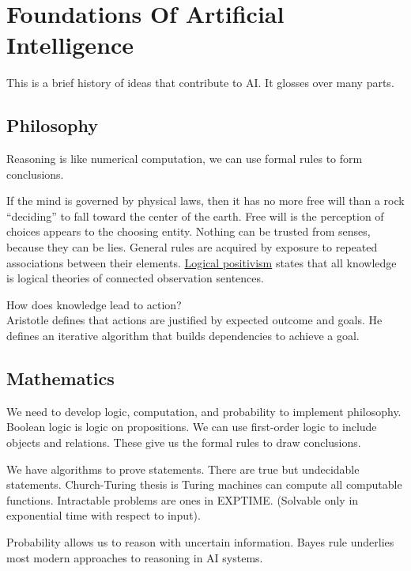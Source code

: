 
\section{Foundations Of Artificial Intelligence} %
\label{sec:foundations_of_artificial_intelligence}
This is a brief history of ideas that contribute to AI.
It glosses over many parts.

\subsection{Philosophy} %
\label{sub:philosophy}
Reasoning is like numerical computation, we can use formal rules to form
conclusions.

If the mind is governed by physical laws, then it has no more free will than a
rock ``deciding'' to fall toward the center of the earth.
Free will is the perception of choices appears to the choosing entity.
Nothing can be trusted from senses, because they can be lies.
General rules are acquired by exposure to repeated associations between their elements.
\uline{Logical positivism} states that all knowledge is logical theories of
connected observation sentences.

How does knowledge lead to action? \\
Aristotle defines that actions are justified by expected outcome and goals.
He defines an iterative algorithm that builds dependencies to achieve a goal.

\subsection{Mathematics} %
\label{sub:mathematics}
We need to develop logic, computation, and probability to implement philosophy.
Boolean logic is logic on propositions.
We can use first-order logic to include objects and relations.
These give us the formal rules to draw conclusions.

We have algorithms to prove statements.
There are true but undecidable statements.
Church-Turing thesis is Turing machines can compute all computable functions.
Intractable problems are ones in \mbox{EXPTIME}.
(Solvable only in exponential time with respect to input).

Probability allows us to reason with uncertain information.
Bayes rule underlies most modern approaches to reasoning in AI systems.

